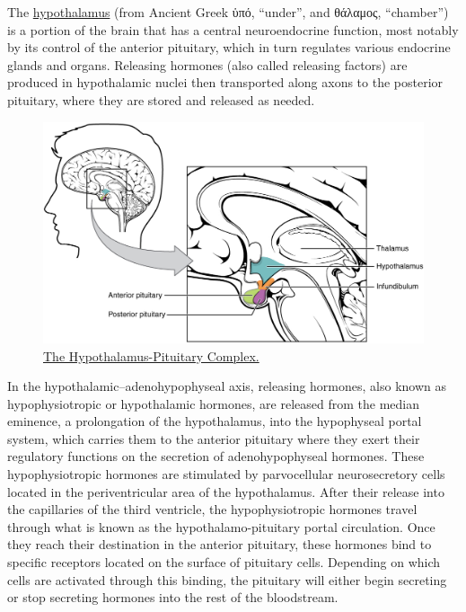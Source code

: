 The \href{https://en.wikipedia.org/wiki/Hypothalamus}{hypothalamus} (from Ancient Greek ὑπό, ``under'', and θάλαμος, ``chamber'') is a portion of the brain that has a central neuroendocrine function, most notably by its control of the anterior pituitary, which in turn regulates various endocrine glands and organs. Releasing hormones (also called releasing factors) are produced in hypothalamic nuclei then transported along axons to the posterior pituitary, where they are stored and released as needed.



\begin{figure}

{\centering \includegraphics[width=0.7\linewidth]{./figures/endocrine/1806_The_Hypothalamus-Pituitary_Complex} 

}

\caption{\href{https://commons.wikimedia.org/wiki/File:1806_The_Hypothalamus-Pituitary_Complex.jpg}{The Hypothalamus-Pituitary Complex.}}\label{fig:hpcomplex}
\end{figure}

In the hypothalamic--adenohypophyseal axis, releasing hormones, also known as hypophysiotropic or hypothalamic hormones, are released from the median eminence, a prolongation of the hypothalamus, into the hypophyseal portal system, which carries them to the anterior pituitary where they exert their regulatory functions on the secretion of adenohypophyseal hormones. These hypophysiotropic hormones are stimulated by parvocellular neurosecretory cells located in the periventricular area of the hypothalamus. After their release into the capillaries of the third ventricle, the hypophysiotropic hormones travel through what is known as the hypothalamo-pituitary portal circulation. Once they reach their destination in the anterior pituitary, these hormones bind to specific receptors located on the surface of pituitary cells. Depending on which cells are activated through this binding, the pituitary will either begin secreting or stop secreting hormones into the rest of the bloodstream.

